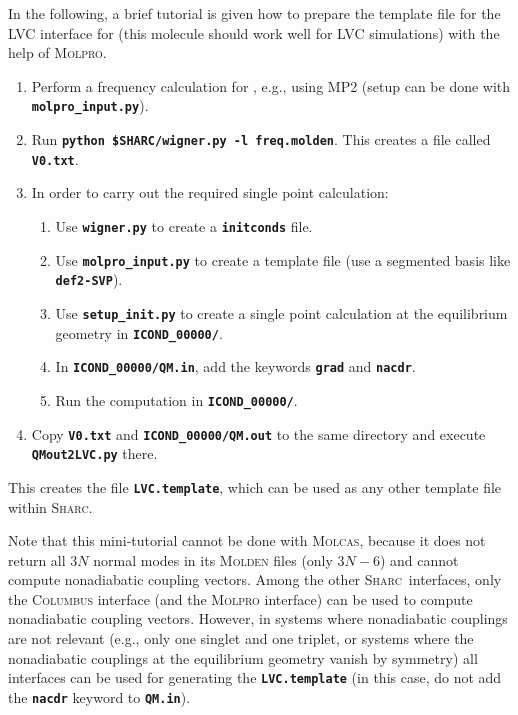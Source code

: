 \documentclass[a4paper,11pt,DIV=15,openany]{scrbook}
\newcommand{\sharc}{\textsc{Sharc}}
\newcommand{\ttt}[1]{\textbf{\texttt{#1}}}
\begin{document}
In the following, a brief tutorial is given how to prepare the template file for the LVC interface for  (this molecule should work well for LVC simulations) with the help of \textsc{Molpro}.
\begin{enumerate}
  \item Perform a frequency calculation for , e.g., using MP2 (setup can be done with \ttt{molpro\_input.py}).
  \item Run \ttt{python \$SHARC/wigner.py -l freq.molden}. This creates a file called \ttt{V0.txt}.
  \item In order to carry out the required single point calculation:
  \begin{enumerate}
    \item Use \ttt{wigner.py} to create a \ttt{initconds} file.
    \item Use \ttt{molpro\_input.py} to create a template file (use a segmented basis like \ttt{def2-SVP}).
    \item Use \ttt{setup\_init.py} to create a single point calculation at the equilibrium geometry in \ttt{ICOND\_00000/}.
    \item In \ttt{ICOND\_00000/QM.in}, add the keywords \ttt{grad} and \ttt{nacdr}. 
    \item Run the computation in \ttt{ICOND\_00000/}.
  \end{enumerate}
  \item Copy \ttt{V0.txt} and \ttt{ICOND\_00000/QM.out} to the same directory and execute \ttt{QMout2LVC.py} there.
\end{enumerate}
This creates the file \ttt{LVC.template}, which can be used as any other template file within \sharc.

Note that this mini-tutorial cannot be done with \textsc{Molcas}, because it does not return all $3N$ normal modes in its \textsc{Molden} files (only $3N-6$) and cannot compute nonadiabatic coupling vectors.
Among the other \sharc\ interfaces, only the \textsc{Columbus} interface (and the \textsc{Molpro} interface) can be used to compute nonadiabatic coupling vectors.
However, in systems where nonadiabatic couplings are not relevant (e.g., only one singlet and one triplet, or systems where the nonadiabatic couplings at the equilibrium geometry vanish by symmetry) all interfaces can be used for generating the \ttt{LVC.template} (in this case, do not add the \ttt{nacdr} keyword to \ttt{QM.in}).

\end{document}
